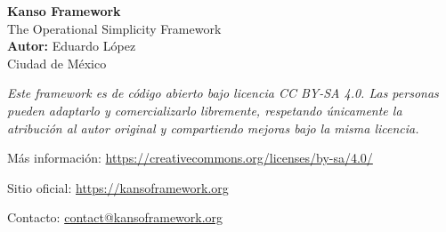 \documentclass[12pt, a4paper, twoside]{book}
\begin{document}
\frontmatter
\begin{titlepage}
    \centering
    \vspace*{3cm}

    {\Huge \textbf{Kanso Framework}}\\[1cm]
    {\Large The Operational Simplicity Framework}\\[2cm]
    {\Large \textbf{Autor:} Eduardo López}\\[0.5cm]
    {\large Ciudad de México}\\[0.5cm]
    \vspace*{2cm}

    \begin{minipage}{0.9\textwidth}
        \footnotesize

        \textit{ Este framework es de código abierto bajo licencia CC BY-SA 4.0. 
        Las personas pueden adaptarlo y comercializarlo libremente, respetando 
        únicamente la atribución al autor original y compartiendo mejoras bajo la misma licencia.}

        \vspace{0.5em}
        Más información: \url{https://creativecommons.org/licenses/by-sa/4.0/}

        Sitio oficial: \url{https://kansoframework.org}

        Contacto: \href{mailto:contact@kansoframework.org}{contact@kansoframework.org}

    \end{minipage}
\end{titlepage}




\tableofcontents

\mainmatter




\appendix



\backmatter
\printindex

\end{document}
